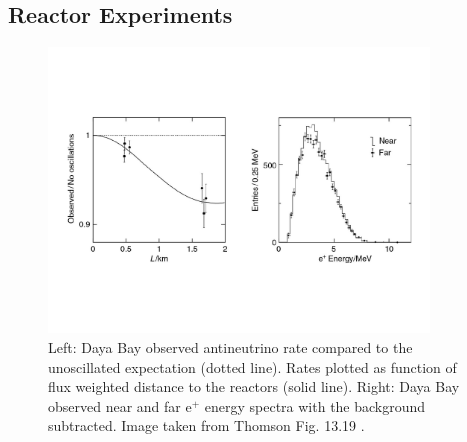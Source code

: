 \subsection{Reactor Experiments}

\begin{figure}
  \centering
  \vspace{-15mm}
  \includegraphics[width=0.9\textwidth,keepaspectratio]
                {pictures/t13_19.pdf}
  \vspace*{-20mm}
  \caption{Left: Daya Bay observed antineutrino rate compared to the
           unoscillated expectation (dotted line). Rates plotted as function
           of flux weighted distance to the reactors (solid line). Right:
           Daya Bay observed near and far e$^+$ energy spectra with the
           background subtracted. Image taken from Thomson Fig. 13.19
           \cite{thomson_modern_2013}.}
  \label{fig:daya}
\end{figure}

